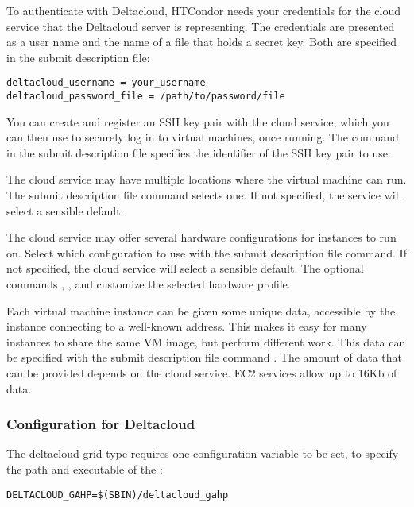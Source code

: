 To authenticate with Deltacloud, HTCondor needs your credentials for
the cloud service that the Deltacloud server is representing. 
The credentials are
presented as a user name and the name of a file that holds a secret key.
Both are specified in the submit description file:

\begin{verbatim}
deltacloud_username = your_username
deltacloud_password_file = /path/to/password/file
\end{verbatim}

You can create and register an SSH key pair with the cloud service,
which you can then use to securely log in to virtual machines,
once running.
The command  in the
submit description file specifies the identifier of the SSH key pair
to use.

The cloud service may have multiple locations where the virtual
machine can run. 
The submit description file command 
selects one.
If not specified, the service will select a sensible default.

The cloud service may offer several hardware configurations for
instances to run on.
Select which configuration to use with the
 submit description file command. 
If not specified, the cloud service will select a sensible default.
The optional commands ,
, and
customize the selected hardware profile.

Each virtual machine instance can be given some unique data, 
accessible by the instance connecting to a well-known address.
This makes it easy for many instances to share the same VM image,
but perform different work.
This data can be specified with the submit description file command
.
The amount of data that can be provided depends on the cloud service.
EC2 services allow up to 16Kb of data.

\subsubsection{\label{sec:Deltacloud-config}Configuration for Deltacloud}

The deltacloud grid type requires one configuration variable 
to be set,
to specify the path and executable of the :

\footnotesize
\begin{verbatim}
DELTACLOUD_GAHP=$(SBIN)/deltacloud_gahp
\end{verbatim}
\normalsize
